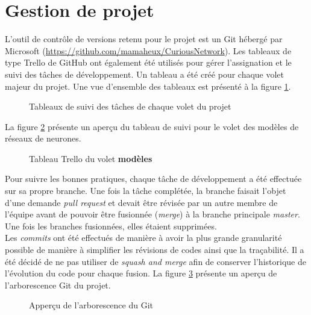 \section{Gestion de projet}
    L'outil de contrôle de versions retenu pour le projet est un Git hébergé par Microsoft (\url{https://github.com/mamaheux/CuriousNetwork}). Les tableaux de type Trello de GitHub ont également été utilisés pour gérer l'assignation et le suivi des tâches de développement. Un tableau a été créé pour chaque volet majeur du projet. Une vue d'ensemble des tableaux est présenté à la figure \ref{fig:trello_boards}.

    \begin{figure}[H]
        \centering
        \caption{Tableaux de suivi des tâches de chaque volet du projet}
        \label{fig:trello_boards}
    \end{figure}

    La figure \ref{fig:trello_board_models} présente un aperçu du tableau de suivi pour le volet des modèles de réseaux de neurones.
    \begin{figure}[H]
        \centering
        \caption[Tableau Trello du volet modèles]{Tableau Trello du volet \textbf{modèles}}
        \label{fig:trello_board_models}
    \end{figure}

    Pour suivre les bonnes pratiques, chaque tâche de développement a été effectuée sur sa propre branche. Une fois la tâche complétée, la branche faisait l'objet d'une demande \textit{pull request} et devait être révisée par un autre membre de l'équipe avant de pouvoir être fusionnée (\textit{merge}) à la branche principale \textit{master}. Une fois les branches fusionnées, elles étaient supprimées.\\
    
    Les \textit{commits} ont été effectués de manière à avoir la plus grande granularité possible de manière à simplifier les révisions de codes ainsi que la traçabilité. Il a été décidé de ne pas utiliser de \textit{squash and merge} afin de conserver l'historique de l'évolution du code pour chaque fusion. La figure \ref{fig:git_graph} présente un aperçu de l'arborescence Git du projet.
    \begin{figure}[H]
        \centering
        \caption{Apperçu de l'arborescence du Git}
        \label{fig:git_graph}
    \end{figure}